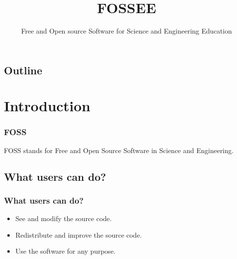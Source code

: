 \documentclass[compress,red]{beamer} %
\title{FOSSEE}
\subtitle{Free and Open source Software for Science and Engineering
Education}
\author[]{}  %
\institute{IIT Bombay}
\date[]{} %
\begin{document}
\begin{frame}
	 \titlepage
\end{frame}

\begin{frame}
\section*{Outline}
\end{frame}


\section{Introduction}
\begin{frame}
\frametitle{FOSS}
\begin{definition}
\alert{FOSS} stands for Free and Open Source Software in Science and Engineering.
\end{definition}
\end{frame}

\subsection{What users can do?}
\begin{frame}
\frametitle{What users can do?}
\begin{example}
\begin{itemize}
\item See and modify the source code.\pause
\item Redistribute and improve the source code.\pause
\item Use the software for any purpose.\pause
\end{itemize}
\end{example}
\end{frame}
\end{document}
